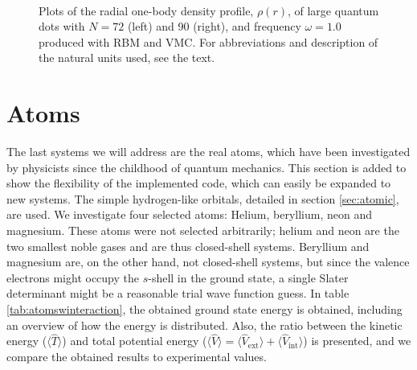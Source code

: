 \begin{figure}
	\centering
	\captionsetup[subfigure]{labelformat=empty}
	\hspace{-0.5cm}
	\\
	\caption{Plots of the radial one-body density profile, $\rho(r)$, of large quantum dots with $N=72$ (left) and 90 (right), and frequency $\omega=1.0$ produced with RBM and VMC. For abbreviations and description of the natural units used, see the text.}
	\label{fig:largedotsOB}
\end{figure}

\section{Atoms}\label{sec:atomsresults}
The last systems we will address are the real atoms, which have been investigated by physicists since the childhood of quantum mechanics. This section is added to show the flexibility of the implemented code, which can easily be expanded to new systems. The simple hydrogen-like orbitals, detailed in section \ref{sec:atomic}, are used. We investigate four selected atoms: Helium, beryllium, neon and magnesium. These atoms were not selected arbitrarily; helium and neon are the two smallest noble gases and are thus closed-shell systems. Beryllium and magnesium are, on the other hand, not closed-shell systems, but since the valence electrons might occupy the $s$-shell in the ground state, a single Slater determinant might be a reasonable trial wave function guess. In table \eqref{tab:atomswinteraction}, the obtained ground state energy is obtained, including an overview of how the energy is distributed. Also, the ratio between the kinetic energy ($\langle\hat{T}\rangle$) and total potential energy ($\langle\hat{V}\rangle=\langle\hat{V}_{\text{ext}}\rangle+\langle\hat{V}_{\text{int}}\rangle$) is presented, and we compare the obtained results to experimental values. 

